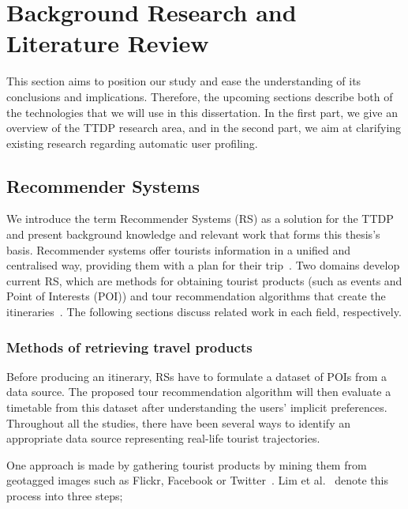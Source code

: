\section{Background Research and Literature Review}

This section aims to position our study and ease the
understanding of its conclusions and implications.
Therefore, the upcoming sections describe both of the
technologies that we will use in this dissertation. In
the first part, we give an overview of the TTDP
research area, and in the second part, we aim at
clarifying existing research regarding automatic user
profiling.

\subsection{Recommender Systems}

We introduce the term Recommender Systems (RS) as a
solution for the TTDP and present background knowledge
and relevant work that forms this thesis's basis.
Recommender systems offer tourists information in a
unified and centralised way, providing them with a
plan for their trip~\cite{Santamaria-Granados2020,
DiBitonto2010a, Lim2018}. Two domains develop current
RS, which are methods for obtaining tourist products
(such as events and Point of Interests (POI)) and tour
recommendation algorithms that create the 
itineraries~\cite{Lim2018}. The following sections
discuss related work in each field, respectively.

\subsubsection{Methods of retrieving travel products}

Before producing an itinerary, RSs have to formulate a
dataset of POIs from a data source. The proposed tour
recommendation algorithm will then evaluate a timetable
from this dataset after understanding the users' implicit
preferences. Throughout all the studies, there have been
several ways to identify an appropriate data source
representing real-life tourist trajectories.


One approach is made by gathering tourist products by
mining them from geotagged images such as Flickr, Facebook
or Twitter~\cite{DeChoudhury2010, Memon2015, Lucchese2012,
Lim2018a, HuiLim, HuiLima, Kurashima2013, Kurashima2010,
Brilhante2013, Brilhante2015 }. Lim et al.~\cite{Lim2018} 
denote this process into three steps; 


